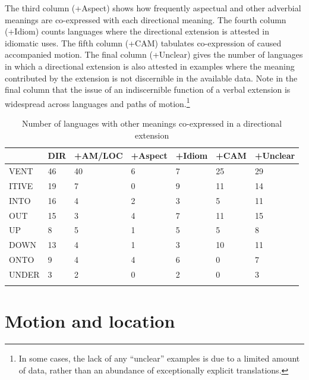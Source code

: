 The third column (+Aspect) shows how frequently aspectual and other adverbial meanings are co-expressed with each directional meaning. The fourth column (+Idiom) counts languages where the directional extension is attested in idiomatic uses. The fifth column (+CAM) tabulates co-expression of caused accompanied motion. The final column (+Unclear) gives the number of languages in which a directional extension is also attested in examples where the meaning contributed by the extension is not discernible in the available data. Note in the final column that the issue of an indiscernible function of a verbal extension is widespread across languages and paths of motion.\footnote{In some cases, the lack of any ``unclear'' examples is due to a limited amount of data, rather than an abundance of exceptionally explicit translations.} 

\begin{table}
	\caption{Number of languages with other meanings co-expressed in a directional extension}
	\label{tab:DIR_plus}
	\begin{tabular}{lllllll} %
		\lsptoprule
		{} &  DIR &  +AM/LOC &  +Aspect &  +Idiom &  +CAM &  +Unclear \\
		\midrule
		VENT &   46 &                40 &                 6 &             7 &    25 &        29 \\
		ITIVE &   19 &                 7 &                 0 &             9 &    11 &        14 \\
		INTO &   16 &                 4 &                 2 &             3 &     5 &        11 \\
		OUT &   15 &                 3 &                 4 &             7 &    11 &        15 \\
		UP &    8 &                 5 &                 1 &             5 &     5 &         8 \\
		DOWN &   13 &                 4 &                 1 &             3 &    10 &        11 \\
		ONTO &    9 &                 4 &                 4 &             6 &     0 &         7 \\
		UNDER &    3 &                 2 &                 0 &             2 &     0 &         3 \\
		\lspbottomrule
	\end{tabular}
\end{table}


\section{Motion and location} \label{sec:comotion2}

